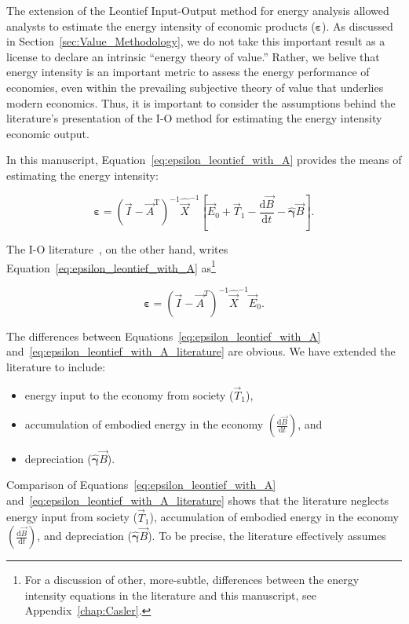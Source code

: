 The extension of the Leontief Input-Output method
for energy analysis allowed analysts to estimate 
the energy intensity 
of economic products ($\bm{\varepsilon}$). 
As discussed in Section~\ref{sec:Value_Methodology},
we do not take this important result as a license
to declare an intrinsic ``energy theory of value.''
Rather, we belive that energy intensity is an 
important metric to assess the energy performance of economies,
even within the prevailing subjective theory of value
that underlies modern economics. 
Thus, it is important to consider the assumptions behind
the literature's presentation of the I-O method 
for estimating the energy intensity economic output.

In this manuscript, Equation~\ref{eq:epsilon_leontief_with_A} 
provides the means of estimating the energy intensity:

\begin{equation*}
	\bm{\varepsilon} 
	= {(\vec{I} - \vec{A}^{\mathrm{T}})}^{-1}\hat{\vec{X}}^{-1}
		\left[\vec{E}_{0} 
				+ \vec{T}_{1} 
				- \frac{\mathrm{d}\vec{B}}{\mathrm{d}t} 
				- \hat{\bm{\gamma}}\vec{B}
		\right].
\end{equation*}

\noindent{}The I-O literature~\cite{Bullard1975,Casler1984}, 
on the other hand, 
writes Equation~\ref{eq:epsilon_leontief_with_A} 
as\footnote{For a discussion of other, more-subtle, differences
between the energy intensity equations in the literature
and this manuscript, see Appendix~\ref{chap:Casler}.}

\begin{equation} \label{eq:epsilon_leontief_with_A_literature}
	\bm{\varepsilon} 
	= {(\vec{I} - \vec{A}^{T})}^{-1}
	\hat{\vec{X}}^{-1}
	\vec{E}_{0}.
\end{equation}

The differences between Equations~\ref{eq:epsilon_leontief_with_A}
and~\ref{eq:epsilon_leontief_with_A_literature} are obvious. 
We have extended the literature to include:

\begin{itemize}
	\item{energy input to the economy from society ($\vec{T}_{1}$),}
	\item{accumulation of embodied energy in the economy 
	$\left( \frac{\mathrm{d}\vec{B}}{\mathrm{d}t} \right)$, and}
	\item{depreciation ($\hat{\bm{\gamma}}\vec{B}$).}
\end{itemize}

\noindent{}Comparison of 
Equations~\ref{eq:epsilon_leontief_with_A}
and~\ref{eq:epsilon_leontief_with_A_literature}
shows that the literature neglects
energy input from society ($\vec{T}_{1}$),
accumulation of embodied energy in the economy 
$\left( \frac{\mathrm{d}\vec{B}}{\mathrm{d}t} \right)$,
and depreciation ($\hat{\bm{\gamma}}\vec{B}$).
To be precise, the literature effectively assumes

